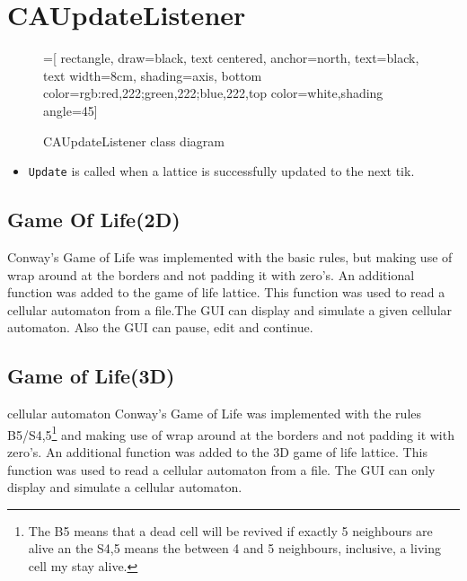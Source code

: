 \documentclass[a4paper, 10pt]{article}
\begin{document}
\section{CAUpdateListener}
\begin{figure}[!ht]
\center
{}=[
    rectangle,
    draw=black,
    text centered,
    anchor=north,
    text=black,
    text width=8cm,
    shading=axis,
    bottom color={rgb:red,222;green,222;blue,222},top color=white,shading angle=45]

\caption{CAUpdateListener class diagram}
\end{figure}
\begin{itemize}
\item \texttt{Update} is called when a lattice is successfully updated to the next tik.
\end{itemize}
\subsection{Game Of Life(2D)}
\label{gol2}
 Conway's Game of Life was implemented with the basic rules, but making use of wrap around at the borders and not padding it with zero's. An additional function was added to the game of life lattice. This function was used to read a cellular automaton from a file.The GUI can  display and simulate a given cellular automaton. Also the GUI can pause, edit and continue.
\subsection{Game of Life(3D)}
\label{gol3}
cellular automaton
 Conway's Game of Life was implemented with the rules B5/S4,5\footnote{The B5 means that a dead cell will be revived if exactly 5 neighbours are alive an the S4,5 means the between 4 and 5 neighbours, inclusive, a living cell my stay alive.} and making use of wrap around at the borders and not padding it with zero's. An additional function was added to the 3D game of life lattice. This function was used to read a cellular automaton from a file. The GUI can only display and simulate a cellular automaton.
\end{document}
